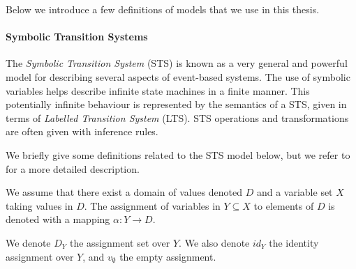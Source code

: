 Below we introduce a few definitions of models that we use in
this thesis.

\paragraph{Symbolic Transition Systems}
\label{sec:definitions:sts}

The \textit{Symbolic Transition System} (STS) is known as a very
general and powerful model for describing several aspects of
event-based systems. The use of symbolic variables helps describe
infinite state machines in a finite manner. This potentially
infinite behaviour is represented by the semantics of a STS,
given in terms of \textit{Labelled Transition System} (LTS). STS
operations and transformations are often given with inference
rules.

We briefly give some definitions related to the STS model below,
but we refer to \cite{FTW05} for a more detailed description.

\begin{definition}
We assume that there exist a domain of values denoted $D$ and a
variable set $X$ taking values in $D$. The assignment of
variables in $Y \subseteq X$ to elements of $D$ is denoted with a
mapping  $\alpha: Y \rightarrow D$.

We denote $D_Y$ the assignment set over $Y$. We also denote
$id_Y$ the identity assignment over $Y$, and $v_\emptyset$ the
empty assignment.
\end{definition}

